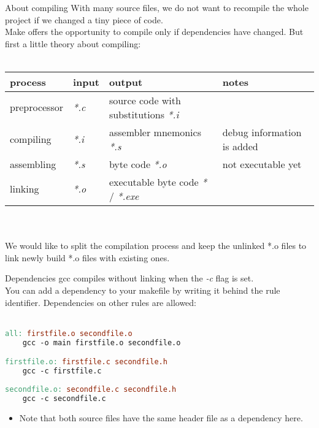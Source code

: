 \begin{frame}{About compiling}
	With many source files, we do not want to recompile the whole project if we changed a tiny piece of code.\\
	Make offers the opportunity to compile only if dependencies have changed. But first a little theory about compiling:\\\ \\
	\scriptsize
	\centering
	\begin{tabular}{|l|l|l|l|}
	\hline
	\textbf{process}	&	\textbf{input}	&	\textbf{output}										&	\textbf{notes}				\\\hline
	preprocessor		&	\textit{*.c}	&	source code with substitutions \textit{*.i}			&								\\\hline
	compiling			&	\textit{*.i}	&	assembler mnemonics \textit{*.s}					&	debug information is added	\\\hline
	assembling			&	\textit{*.s}	&	byte code \textit{*.o}								&	not executable yet			\\\hline
	linking				&	\textit{*.o}	&	executable byte code \textit{*} / \textit{*.exe}	&								\\\hline				
	\end{tabular}\ \\\ \\
	\flushleft
	\normalsize
	We would like to split the compilation process and keep the unlinked *.o files to link newly build *.o files with existing ones.
\end{frame}

\begin{frame}[fragile = singleslide]{Dependencies}
	gcc compiles without linking when the \textit{-c} flag is set.\\
	You can add a dependency to your makefile by writing it behind the rule identifier. Dependencies on other rules are allowed:\\\ \\
	\begin{lstlisting}[language=make,basicstyle=\scriptsize,numbers=none]
all: firstfile.o secondfile.o 
	gcc -o main firstfile.o secondfile.o

firstfile.o: firstfile.c secondfile.h
	gcc -c firstfile.c
	
secondfile.o: secondfile.c secondfile.h
	gcc -c secondfile.c
\end{lstlisting}
	\begin{itemize}
		\item Note that both source files have the same header file as a dependency here.
	\end{itemize}
\end{frame}


